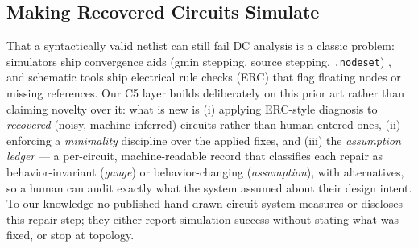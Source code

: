 \subsection{Making Recovered Circuits Simulate}
That a syntactically valid netlist can still fail DC analysis is a
classic problem: simulators ship convergence aids (gmin stepping,
source stepping, \texttt{.nodeset}) \cite{ngspice}, and schematic
tools ship electrical rule checks (ERC) that flag floating nodes or
missing references. Our C5 layer builds deliberately on this prior
art rather than claiming novelty over it: what is new is (i) applying
ERC-style diagnosis to \emph{recovered} (noisy, machine-inferred)
circuits rather than human-entered ones, (ii) enforcing a
\emph{minimality} discipline over the applied fixes, and (iii) the
\emph{assumption ledger} — a per-circuit, machine-readable record that
classifies each repair as behavior-invariant (\emph{gauge}) or
behavior-changing (\emph{assumption}), with alternatives, so a human
can audit exactly what the system assumed about their design intent.
To our knowledge no published hand-drawn-circuit system measures or
discloses this repair step; they either report simulation success
without stating what was fixed, or stop at topology.
